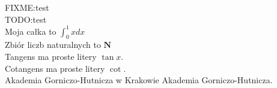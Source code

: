 \documentclass[a4paper,11pt]{article}
\newcommand{\fixme}[1]{\colorbox{yellow!50}{FIXME:{#1}}}
\newcommand{\todo}[1]{\colorbox{red!20}{TODO:{#1}}}
\newcommand{\myint}[3]{{\ensuremath{\int_{#1}^{#2} {#3} dx}}}
\newcommand{\foo}[1]{\mathbf{#1}}
\newcommand{\tg}{\tan x}
\newcommand{\ctg}{\cot}
\def \agh {Akademia Gorniczo-Hutnicza}
\begin{document}
\fixme{test} \\
\todo{test} \\ 
Moja całka to \myint{0}{1}{x} \\
Zbiór liczb naturalnych to \( \foo{N} \) \\
Tangens ma proste litery \( \tg \). \\
Cotangens ma proste litery \( \ctg \). \\

{\agh} w Krakowie \agh.
\end{document}
